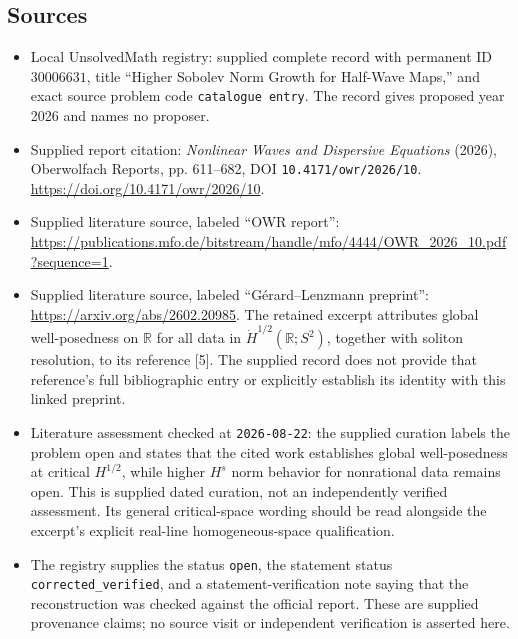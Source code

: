\documentclass[11pt]{article}
\newcommand{\R}{\mathbb{R}}
\begin{document}
\subsection{Sources}
\begin{itemize}
\item Local UnsolvedMath registry: supplied complete record with permanent ID \(30006631\), title ``Higher Sobolev Norm Growth for Half-Wave Maps,'' and exact source problem code \texttt{catalogue entry}. The record gives proposed year 2026 and names no proposer.
\item Supplied report citation: \emph{Nonlinear Waves and Dispersive Equations} (2026), Oberwolfach Reports, pp. 611--682, DOI \texttt{10.4171/owr/2026/10}. \url{https://doi.org/10.4171/owr/2026/10}.
\item Supplied literature source, labeled ``OWR report'': \url{https://publications.mfo.de/bitstream/handle/mfo/4444/OWR_2026_10.pdf?sequence=1}.
\item Supplied literature source, labeled ``G\'erard--Lenzmann preprint'': \url{https://arxiv.org/abs/2602.20985}. The retained excerpt attributes global well-posedness on \(\R\) for all data in \(\dot H^{1/2}(\R;S^2)\), together with soliton resolution, to its reference [5]. The supplied record does not provide that reference's full bibliographic entry or explicitly establish its identity with this linked preprint.
\item Literature assessment checked at \texttt{2026-08-22}: the supplied curation labels the problem open and states that the cited work establishes global well-posedness at critical \(H^{1/2}\), while higher \(H^s\) norm behavior for nonrational data remains open. This is supplied dated curation, not an independently verified assessment. Its general critical-space wording should be read alongside the excerpt's explicit real-line homogeneous-space qualification.
\item The registry supplies the status \texttt{open}, the statement status \texttt{corrected\_verified}, and a statement-verification note saying that the reconstruction was checked against the official report. These are supplied provenance claims; no source visit or independent verification is asserted here.
\end{itemize}
\end{document}
